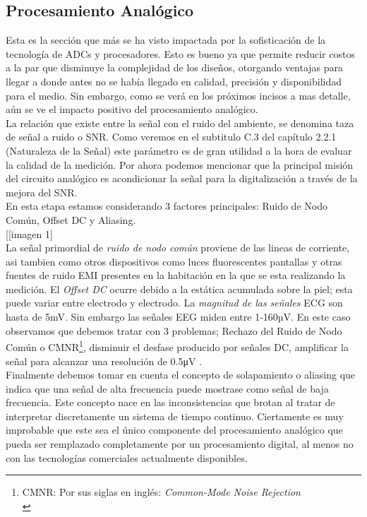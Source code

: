 \subsection{Procesamiento Analógico}
\label{sec:org0a9564b}
Esta es la sección que más se ha visto impactada por la sofisticación de la tecnología de ADCs y procesadores. Esto es bueno ya que permite reducir costos a la par que disminuye la complejidad de los diseños, otorgando ventajas para llegar a donde antes no se había llegado en calidad, precisión y disponibilidad para el medio. Sin embargo, como se verá en los próximos incisos a mas detalle, aún se ve el impacto positivo del procesamiento analógico.\\

La relación que existe entre la señal con el ruido del ambiente, se denomina taza de señal a ruido o SNR. Como veremos en el subtitulo C.3 del capítulo 2.2.1 (Naturaleza de la Señal) este parámetro es de gran utilidad a la hora de evaluar la calidad de la medición. Por ahora podemos mencionar que la principal misión del circuito analógico es acondicionar la señal para la digitalización a través de la mejora del SNR.\\

En esta etapa estamos considerando 3 factores principales: Ruido de Nodo Común, Offset DC y Aliasing.\\

[[imagen 1]\\

La señal primordial de \emph{ruido de nodo común} proviene de las lineas de corriente, asi tambien como otros dispositivos como luces fluorescentes pantallas y otras fuentes de ruido EMI presentes en la habitación en la que se esta realizando la medición. El \emph{Offset DC} ocurre debido a la estática acumulada sobre la piel; esta puede variar entre electrodo y electrodo. La \emph{magnitud de las señales} ECG son hasta de 5mV. Sin embargo las señales EEG miden entre 1-160µV. En este caso observamos que debemos tratar con 3 problemas; Rechazo del Ruido de Nodo Común o CMNR\footnote{CMNR: Por sus siglas en inglés: \emph{Common-Mode Noise Rejection}\\}, disminuir el desfase producido por señales DC, amplificar la señal para alcanzar una resolución de 0.5μV \cite{IFCN1999a}.\\

Finalmente debemos tomar en cuenta el concepto de solapamiento o aliasing que indica que una señal de alta frecuencia puede mostrase como señal de baja frecuencia. Este concepto nace en las inconsistencias que brotan al tratar de interpretar discretamente un sistema de tiempo continuo. Ciertamente es muy improbable que este  sea el único componente del procesamiento analógico que pueda ser remplazado completamente por un procesamiento digital, al menos no con las tecnologías comerciales actualmente disponibles.\\

